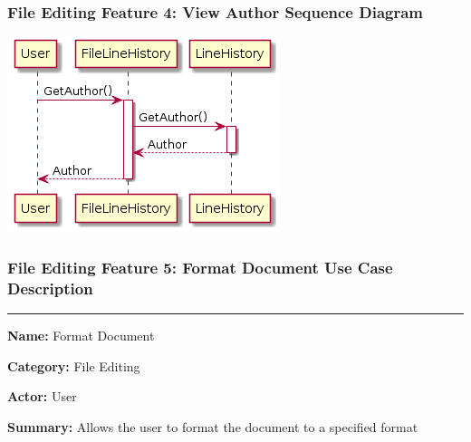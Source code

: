 \documentclass[twoside,letterpaper]{article}
\begin{document}
\subsubsection[File Editing Feature 4: View Author Sequence Diagram]{\rmfamily\bfseries\color{black}
	File Editing Feature 4: View Author Sequence Diagram}
\hypertarget{RefHeading22059017292}{}

\bigskip

\includegraphics[width=\textwidth]{images/SequenceDiagrams/Author}

\newpage

\subsubsection[File Editing Feature 5: Format Document]{\rmfamily\bfseries\color{black}
	File Editing Feature 5: Format Document Use Case Description}
\hypertarget{RefHeading22059017292}{}

\vspace{2pt}
\hrule
\vspace{8pt}
	\noindent\textbf{Name:} Format Document \newline
	
	\noindent\textbf{Category:} File Editing \newline
	
	\noindent\textbf{Actor:} User \newline
	
	\noindent\textbf{Summary:} Allows the user to format the document to a specified format \newline
	
\end{document}
